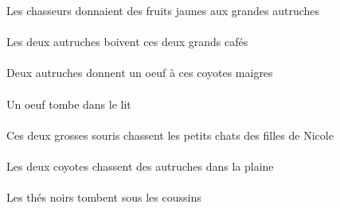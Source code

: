 \begin{exe}
Les chasseurs donnaient des fruits jaunes aux grandes autruches
\ex\gll
\DEFDuErg{}   \autrucheBDuErg{}   \DEMDuAbs{}   \grandCDu{}   \cafeCDuAbs{}  \boireVtPrsCDu{}\\
\DEFDuErgP{}   \autrucheBDuErgP{}   \DEMDuAbsP{}   \grandCDuP{}   \cafeCDuAbsP{}  \boireVtPrsCDuP{}\\
Les deux autruches boivent ces deux grands cafés
\ex\gll
\INDDuErg{}   \autrucheBDuErg{}    \DEMPlDat{}   \maigreCPl{}   \coyoteCPlDat{}   \INDSgAbs{}   \oeufCSgAbs{}  \donnerVdPrsCSg{}\\
\INDDuErgP{}   \autrucheBDuErgP{}    \DEMPlDatP{}   \maigreCPlP{}   \coyoteCPlDatP{}   \INDSgAbsP{}   \oeufCSgAbsP{}  \donnerVdPrsCSgP{}\\
Deux autruches donnent un oeuf à ces coyotes maigres
\ex\gll
\INDSgAbs{}   \oeufCSgAbs{}    \DEFSgObl{}   \litDSgObl{}   \DANS{}  \tomberViPrsCSg{}\\
\INDSgAbsP{}   \oeufCSgAbsP{}    \DEFSgOblP{}   \litDSgOblP{}   \DANSP{}  \tomberViPrsCSgP{}\\
Un oeuf tombe dans le lit
\ex\gll
\DEMDuErg{}   \grosBDu{}   \sourisBDuErg{}   \DEFPlAbs{}    \DEFPlObl{}    \INDSgObl{}   \NicoleBSgObl{}   \DE{}   \filleCPlObl{}   \DE{}   \petitDPl{}   \chatDPlAbs{}  \chasserVtPrsDPl{}\\
\DEMDuErgP{}   \grosBDuP{}   \sourisBDuErgP{}   \DEFPlAbsP{}    \DEFPlOblP{}    \INDSgOblP{}   \NicoleBSgOblP{}   \DEP{}   \filleCPlOblP{}   \DEP{}   \petitDPlP{}   \chatDPlAbsP{}  \chasserVtPrsDPlP{}\\
Ces deux grosses souris chassent les petits chats des filles de Nicole
\ex\gll
\DEFSgObl{}   \plaineASgObl{}   \DANS{}   \DEFDuErg{}   \coyoteCDuErg{}   \INDPlAbs{}   \autrucheBPlAbs{}  \chasserVtPrsBPl{}\\
\DEFSgOblP{}   \plaineASgOblP{}   \DANSP{}   \DEFDuErgP{}   \coyoteCDuErgP{}   \INDPlAbsP{}   \autrucheBPlAbsP{}  \chasserVtPrsBPlP{}\\
Les deux coyotes chassent des autruches dans la plaine
\ex\gll
\DEFPlAbs{}   \noirBPl{}   \theBPlAbs{}    \DEFPlObl{}   \coussinBPlObl{}   \SOUS{}  \tomberViPrsBPl{}\\
\DEFPlAbsP{}   \noirBPlP{}   \theBPlAbsP{}    \DEFPlOblP{}   \coussinBPlOblP{}   \SOUSP{}  \tomberViPrsBPlP{}\\
Les thés noirs tombent sous les coussins
\ex\gll
\DEFDuErg{}   \jauneDDu{}   \chatDDuErg{}    \DEFSgObl{}   \petitDSg{}   \cuisineDSgObl{}   \DANS{}   \DEFPlAbs{}    \DEFSgObl{}   \maisonDSgObl{}   \DE{}   \sourisBPlAbs{}  \chasserVtPrsBPl{}\\

\end{exe}
